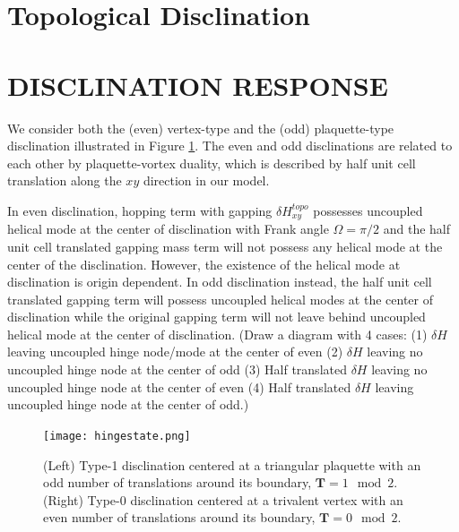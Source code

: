 \section{Topological Disclination}









\section{DISCLINATION RESPONSE}
We consider both the (even) vertex-type and the (odd) plaquette-type disclination illustrated in Figure \ref{fig:disclination}. The even and odd disclinations are related to each other by plaquette-vortex duality, which is described by half unit cell translation along the $xy$ direction in our model. 

In even disclination, hopping term with gapping $\delta H_{xy}^{topo}$ possesses uncoupled helical mode at the center of disclination with Frank angle $\Omega = \pi/2$ and the half unit cell translated gapping mass term will not possess any helical mode at the center of the disclination. However, the existence of the helical mode at disclination is origin dependent. In odd disclination instead, the half unit cell translated gapping term will possess uncoupled helical modes at the center of disclination while the original gapping term will not leave behind uncoupled helical mode at the center of disclination. {\color{red}(Draw a diagram with 4 cases: (1) $\delta H$ leaving uncoupled hinge node/mode at the center of even (2) $\delta H$ leaving no uncoupled hinge node at the center of odd (3) Half translated $\delta H$ leaving no uncoupled hinge node at the center of even (4) Half translated $\delta H$ leaving uncoupled hinge node at the center of odd.)}


\begin{figure}[htbp]
    \centering\texttt{[image: hingestate.png]}
    \caption{(Left) Type-1 disclination centered at a triangular plaquette with an odd number of translations around its boundary, $\mathbf{T} = 1 \mod 2$. (Right) Type-0 disclination centered at a trivalent vertex with an even number of translations around its boundary, $\mathbf{T} = 0 \mod 2$.} \label{fig:disclination}
\end{figure}

